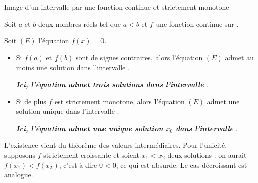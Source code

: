 \begin{acoller}{Image d'un intervalle par une fonction continue et strictement monotone}
\begin{propriete}[s]
	Soit $a$ et $b$ deux nombres réels tel que $a<b$ et $f$ une fonction continue sur .
	\par Soit $(E)$ l'équation $f(x)=0$.
	\begin{itemize}
		\item Si $f(a)$ et $f(b)$ sont de signes contraires, alors l'équation $(E)$ admet au moins une solution dans l'intervalle .\\
		\hspace*{3cm} 
		\par {\bf \it Ici, l'équation admet trois solutions dans l'intervalle }.
	\end{itemize}
\breakbox
\begin{itemize}
		\item Si de plus $f$ est strictement monotone, alors l'équation $(E)$ admet une solution unique dans l'intervalle .\\
		\hspace*{3cm}
		\par {\bf \it Ici, l'équation admet une unique solution $x_0$ dans l'intervalle }.
	\end{itemize}
\end{propriete}
\end{acoller}
\ifenseignant %
\begin{preuve}
L'existence vient du théorème des valeurs intermédiaires. Pour l'unicité, supposons $f$ strictement croissante et soient $x_1<x_2$ deux solutions : on aurait $f(x_1)<f(x_2)$, c'est-à-dire $0<0$, ce qui est absurde. Le cas décroissant est analogue.
\end{preuve}
\fi %
\collerici
